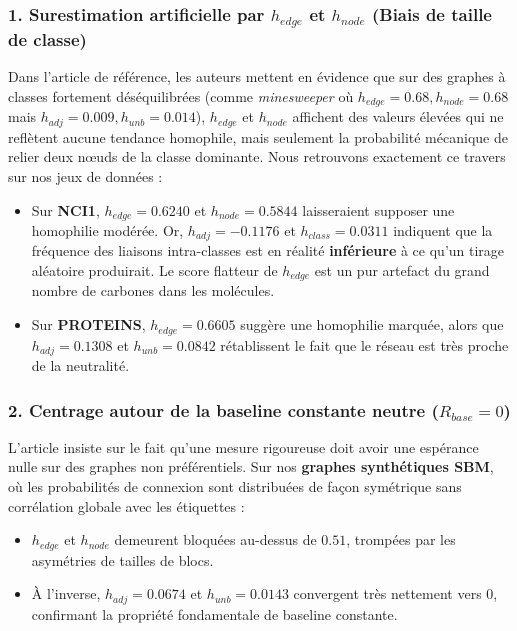 \documentclass[11pt,a4paper]{article}
\begin{document}
\subsubsection{1. Surestimation artificielle par $h_{edge}$ et $h_{node}$ (Biais de taille de classe)}
Dans l'article de référence, les auteurs mettent en évidence que sur des graphes à classes fortement déséquilibrées (comme \textit{minesweeper} où $h_{edge} = 0.68, h_{node} = 0.68$ mais $h_{adj} = 0.009, h_{unb} = 0.014$), $h_{edge}$ et $h_{node}$ affichent des valeurs élevées qui ne reflètent aucune tendance homophile, mais seulement la probabilité mécanique de relier deux nœuds de la classe dominante.
Nous retrouvons exactement ce travers sur nos jeux de données :
\begin{itemize}[leftmargin=1.5em]
    \item Sur \textbf{NCI1}, $h_{edge} = 0.6240$ et $h_{node} = 0.5844$ laisseraient supposer une homophilie modérée. Or, $h_{adj} = -0.1176$ et $h_{class} = 0.0311$ indiquent que la fréquence des liaisons intra-classes est en réalité \textbf{inférieure} à ce qu'un tirage aléatoire produirait. Le score flatteur de $h_{edge}$ est un pur artefact du grand nombre de carbones dans les molécules.
    \item Sur \textbf{PROTEINS}, $h_{edge} = 0.6605$ suggère une homophilie marquée, alors que $h_{adj} = 0.1308$ et $h_{unb} = 0.0842$ rétablissent le fait que le réseau est très proche de la neutralité.
\end{itemize}

\subsubsection{2. Centrage autour de la baseline constante neutre ($R_{base} = 0$)}
L'article insiste sur le fait qu'une mesure rigoureuse doit avoir une espérance nulle sur des graphes non préférentiels.
Sur nos \textbf{graphes synthétiques SBM}, où les probabilités de connexion sont distribuées de façon symétrique sans corrélation globale avec les étiquettes :
\begin{itemize}[leftmargin=1.5em]
    \item $h_{edge}$ et $h_{node}$ demeurent bloquées au-dessus de $0.51$, trompées par les asymétries de tailles de blocs.
    \item À l'inverse, \textbf{$h_{adj} = 0.0674$} et \textbf{$h_{unb} = 0.0143$} convergent très nettement vers 0, confirmant la propriété fondamentale de baseline constante.
\end{itemize}
\end{document}
